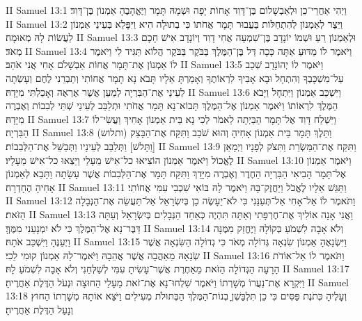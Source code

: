 II Samuel 13:1	וַיְהִי אַחֲרֵי־כֵן וּלְאַבְשָׁלוֹם בֶּן־דָּוִד אָחוֹת יָפָה וּשְׁמָהּ תָּמָר וַיֶּאֱהָבֶהָ אַמְנוֹן בֶּן־דָּוִד׃
II Samuel 13:2	וַיֵּצֶר לְאַמְנוֹן לְהִתְחַלּוֹת בַּעֲבוּר תָּמָר אֲחֹתוֹ כִּי בְתוּלָה הִיא וַיִּפָּלֵא בְּעֵינֵי אַמְנוֹן לַעֲשׂוֹת לָהּ מְאוּמָה׃
II Samuel 13:3	וּלְאַמְנוֹן רֵעַ וּשְׁמוֹ יוֹנָדָב בֶּן־שִׁמְעָה אֲחִי דָוִד וְיוֹנָדָב אִישׁ חָכָם מְאֹד׃
II Samuel 13:4	וַיֹּאמֶר לוֹ מַדּוּעַ אַתָּה כָּכָה דַּל בֶּן־הַמֶּלֶךְ בַּבֹּקֶר בַּבֹּקֶר הֲלוֹא תַּגִּיד לִי וַיֹּאמֶר לוֹ אַמְנוֹן אֶת־תָּמָר אֲחוֹת אַבְשָׁלֹם אָחִי אֲנִי אֹהֵב׃
II Samuel 13:5	וַיֹּאמֶר לוֹ יְהוֹנָדָב שְׁכַב עַל־מִשְׁכָּבְךָ וְהִתְחָל וּבָא אָבִיךָ לִרְאוֹתֶךָ וְאָמַרְתָּ אֵלָיו תָּבֹא נָא תָמָר אֲחוֹתִי וְתַבְרֵנִי לֶחֶם וְעָשְׂתָה לְעֵינַי אֶת־הַבִּרְיָה לְמַעַן אֲשֶׁר אֶרְאֶה וְאָכַלְתִּי מִיָּדָהּ׃
II Samuel 13:6	וַיִּשְׁכַּב אַמְנוֹן וַיִּתְחָל וַיָּבֹא הַמֶּלֶךְ לִרְאוֹתוֹ וַיֹּאמֶר אַמְנוֹן אֶל־הַמֶּלֶךְ תָּבוֹא־נָא תָּמָר אֲחֹתִי וּתְלַבֵּב לְעֵינַי שְׁתֵּי לְבִבוֹת וְאֶבְרֶה מִיָּדָהּ׃
II Samuel 13:7	וַיִּשְׁלַח דָּוִד אֶל־תָּמָר הַבַּיְתָה לֵאמֹר לְכִי נָא בֵּית אַמְנוֹן אָחִיךְ וַעֲשִׂי־לוֹ הַבִּרְיָה׃
II Samuel 13:8	וַתֵּלֶךְ תָּמָר בֵּית אַמְנוֹן אָחִיהָ וְהוּא שֹׁכֵב וַתִּקַּח אֶת־הַבָּצֵק (ותלוש) [וַתָּלשׁ] וַתְּלַבֵּב לְעֵינָיו וַתְּבַשֵּׁל אֶת־הַלְּבִבוֹת׃
II Samuel 13:9	וַתִּקַּח אֶת־הַמַּשְׂרֵת וַתִּצֹק לְפָנָיו וַיְמָאֵן לֶאֱכוֹל וַיֹּאמֶר אַמְנוֹן הוֹצִיאוּ כל־אִישׁ מֵעָלַי וַיֵּצְאוּ כל־אִישׁ מֵעָלָיו׃
II Samuel 13:10	וַיֹּאמֶר אַמְנוֹן אֶל־תָּמָר הָבִיאִי הַבִּרְיָה הַחֶדֶר וְאֶבְרֶה מִיָּדֵךְ וַתִּקַּח תָּמָר אֶת־הַלְּבִבוֹת אֲשֶׁר עָשָׂתָה וַתָּבֵא לְאַמְנוֹן אָחִיהָ הֶחָדְרָה׃
II Samuel 13:11	וַתַּגֵּשׁ אֵלָיו לֶאֱכֹל וַיַּחֲזֶק־בָּהּ וַיֹּאמֶר לָהּ בּוֹאִי שִׁכְבִי עִמִּי אֲחוֹתִי׃
II Samuel 13:12	וַתֹּאמֶר לוֹ אַל־אָחִי אַל־תְּעַנֵּנִי כִּי לֹא־יֵעָשֶׂה כֵן בְּיִשְׂרָאֵל אַל־תַּעֲשֵׂה אֶת־הַנְּבָלָה הַזֹּאת׃
II Samuel 13:13	וַאֲנִי אָנָה אוֹלִיךְ אֶת־חֶרְפָּתִי וְאַתָּה תִּהְיֶה כְּאַחַד הַנְּבָלִים בְּיִשְׂרָאֵל וְעַתָּה דַּבֶּר־נָא אֶל־הַמֶּלֶךְ כִּי לֹא יִמְנָעֵנִי מִמֶּךָּ׃
II Samuel 13:14	וְלֹא אָבָה לִשְׁמֹעַ בְּקוֹלָהּ וַיֶּחֱזַק מִמֶּנָּה וַיְעַנֶּהָ וַיִּשְׁכַּב אֹתָהּ׃
II Samuel 13:15	וַיִּשְׂנָאֶהָ אַמְנוֹן שִׂנְאָה גְּדוֹלָה מְאֹד כִּי גְדוֹלָה הַשִּׂנְאָה אֲשֶׁר שְׂנֵאָהּ מֵאַהֲבָה אֲשֶׁר אֲהֵבָהּ וַיֹּאמֶר־לָהּ אַמְנוֹן קוּמִי לֵכִי׃
II Samuel 13:16	וַתֹּאמֶר לוֹ אַל־אוֹדֹת הָרָעָה הַגְּדוֹלָה הַזֹּאת מֵאַחֶרֶת אֲשֶׁר־עָשִׂיתָ עִמִּי לְשַׁלְּחֵנִי וְלֹא אָבָה לִשְׁמֹעַ לָהּ׃
II Samuel 13:17	וַיִּקְרָא אֶת־נַעֲרוֹ מְשָׁרְתוֹ וַיֹּאמֶר שִׁלְחוּ־נָא אֶת־זֹאת מֵעָלַי הַחוּצָה וּנְעֹל הַדֶּלֶת אַחֲרֶיהָ׃
II Samuel 13:18	וְעָלֶיהָ כְּתֹנֶת פַּסִּים כִּי כֵן תִּלְבַּשְׁןָ בְנוֹת־הַמֶּלֶךְ הַבְּתוּלֹת מְעִילִים וַיֹּצֵא אוֹתָהּ מְשָׁרְתוֹ הַחוּץ וְנָעַל הַדֶּלֶת אַחֲרֶיהָ׃
